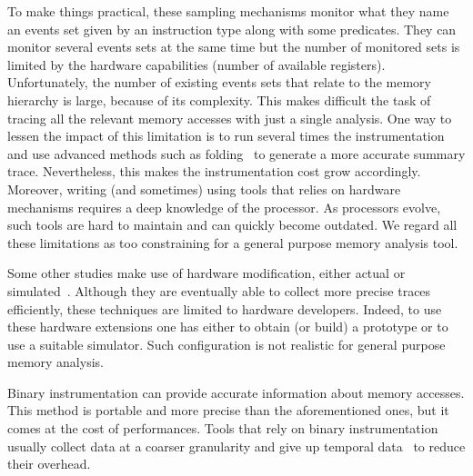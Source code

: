 To make things practical, these sampling mechanisms monitor what they name an events set given by an instruction type along with some predicates.
They can monitor several events sets at the same time but the number of monitored sets is limited by the hardware capabilities (number of available
registers). Unfortunately, the number of existing events sets that relate to the memory hierarchy is large, because of its complexity.
This makes difficult the task of tracing all the relevant memory accesses with just a single analysis.
One way to lessen the impact of this limitation is to run several times the
instrumentation and use advanced methods such as
folding~\cite{Servat15Towards} to generate a more accurate summary trace.
Nevertheless, this makes the instrumentation cost grow accordingly.
Moreover, writing (and sometimes) using tools that relies on hardware mechanisms
requires a deep knowledge of the processor. As processors evolve,
such tools are hard to maintain and can quickly become outdated.
We regard all these limitations as too constraining for a general purpose
memory analysis tool.

Some other studies make use of hardware modification, either actual or
simulated~\cite{Bao08HMTT,Martonosi92MemSpy}.  Although they are eventually able to collect
more precise traces efficiently, these techniques are limited to hardware
developers. Indeed, to use these hardware extensions one has either to obtain (or build) a
prototype or to use a suitable simulator. Such configuration is not realistic
for general purpose memory analysis.

Binary instrumentation can provide accurate information about memory accesses.
This method is portable and  more precise than the aforementioned ones,
but it comes at the cost of performances. 
Tools that rely on binary instrumentation usually collect data at a coarser granularity and give up temporal
data~\cite{Beniamine15TABARNAC} to reduce their overhead.


